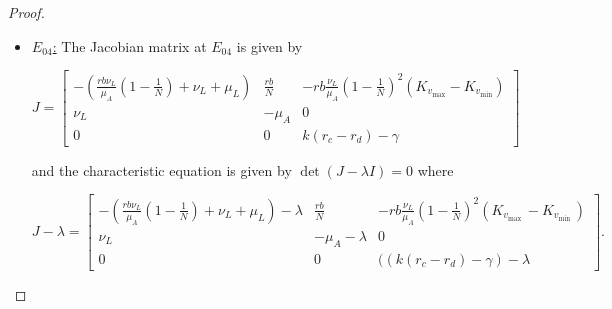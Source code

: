\documentclass{article}
\theoremstyle{remark}
\theoremstyle{custom} %
\begin{document}
\begin{proof}
\begin{itemize}
The first eigenvalue \(\lambda_1=k(- r_c+r_d)+\gamma\) and the other two eigenvalues are given by $$
\begin{aligned}
& \lambda_{2,3}=\frac{-\left(\left(\frac{r b \nu_L}{\mu_A}\left(1-\frac{1}{{N}}\right)+\nu_L+\mu_L\right)+\mu_A\right)}{2} \pm \\
& \frac{\sqrt{\left(\left(\frac{r b \nu_L}{\mu_A}\left(1-\frac{1}{{N}}\right)+\nu_L+\mu_L\right)+\mu_A\right)^2-4\left(\left(\frac{r b \nu_L}{\mu_A}\left(1-\frac{1}{{N}}\right)+\nu_L+\mu_L\right) \mu_A-\frac{r b \nu_L}{{N}}\right)}}{2}.
\end{aligned}
$$

Since $k>0$, the eigenvalue \(\lambda_1\) will be negative if and only if $k\left(-r_c+r_d\right)+\gamma<0 \Leftrightarrow r_c-r_d>\frac{\gamma}{k}$.

The eigenvalues \(\lambda_{2,3}\) will have negative real parts if and only if

$$
\begin{aligned}
& \left(\frac{r b \nu_L}{\mu_A}\left(1-\frac{1}{{N}}\right)+\nu_L+\mu_L\right) \mu_A-\frac{r b \nu_L}{{N}}>0 \\
& \Leftrightarrow \quad\left(1-\frac{2}{{N}}\right)>-\frac{\left(\nu_L+\mu_L\right) \mu_A}{r b \nu_L} = \frac{1}{{N}} \\
\end{aligned}
$$

which is true if $N>1$. Since $N>1$ and $r_c-r_d>\frac{\gamma}{k}$ are also existence conditions for ${\tilde{E}_{03}}$, hence, ${\tilde{E}_{03}}$ is LAS, confirming the stability condition stated in item 3. 

\item \underline{$E_{04}$:} The Jacobian matrix at $E_{04}$ is given by

$$
J=\left[\begin{array}{ccc}
-\left(\frac{r b \nu_L}{\mu_A}\left(1-\frac{1}{{N}}\right)+\nu_L+\mu_L\right) & \frac{r b}{{N}} & -r b \frac{\nu_L}{\mu_A}\left(1-\frac{1}{{N}}\right)^2\left(K_{v_{\max }}-K_{v_{\min }}\right) \\
\nu_L & -\mu_A & 0 \\
0 & 0 & k(r_c - r_d) -\gamma
\end{array}\right]
$$

and the characteristic equation is given by \(\det(J - \lambda I) = 0\) where

$$
J-\lambda=\left[\begin{array}{ccc}
-\left(\frac{r b \nu_L}{\mu_A}\left(1-\frac{1}{{N}}\right)+\nu_L+\mu_L\right)-\lambda & \frac{r b}{{N}} & -r b \frac{\nu_L}{\mu_A}\left(1-\frac{1}{{N}}\right)^2\left(K_{v_{\text {max }}}-K_{v_{\text {min }}}\right) \\
\nu_L & -\mu_A-\lambda & 0 \\
0 & 0 & ((k(r_c - r_d) -\gamma)-\lambda
\end{array}\right].
$$


\end{itemize}
\end{proof}
\end{document}
